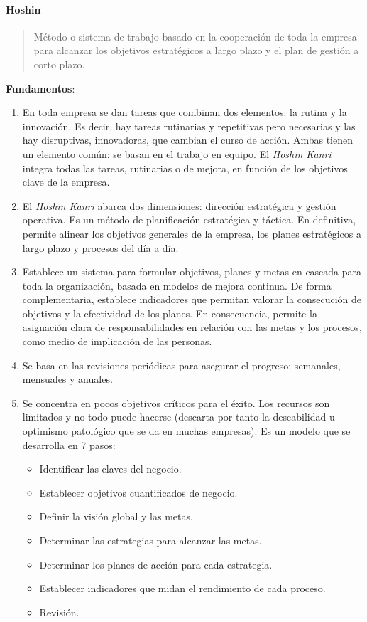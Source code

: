 \documentclass[oneside]{book}
\begin{document}
\paragraph{Hoshin}

\begin{quote}
	Método o sistema de trabajo basado en la cooperación de toda la empresa para alcanzar los objetivos estratégicos a largo plazo y el plan de gestión a corto plazo.
\end{quote}
\textbf{Fundamentos}:
\begin{enumerate}
	\item En toda empresa se dan tareas que combinan dos elementos: la rutina y la innovación. Es decir, hay tareas rutinarias y repetitivas pero necesarias y las hay disruptivas, innovadoras, que cambian el curso de acción. Ambas tienen un elemento común: se basan en el trabajo en equipo. El \textit{Hoshin Kanri} integra todas las tareas, rutinarias o de mejora, en función de los objetivos clave de la empresa.
	
	\item El \textit{Hoshin Kanri} abarca dos dimensiones: dirección estratégica y gestión operativa. Es un método de planificación estratégica y táctica. En definitiva, permite alinear los objetivos generales de la empresa, los planes estratégicos a largo plazo y procesos del día a día.
	
	\item  Establece un sistema para formular objetivos, planes y metas en cascada para toda la organización, basada en modelos de mejora continua. De forma complementaria, establece indicadores que permitan valorar la consecución de objetivos y la efectividad de los planes. En consecuencia, permite la asignación clara de responsabilidades en relación con las metas y los procesos, como medio de implicación de las personas.
	
	\item  Se basa en las revisiones periódicas para asegurar el progreso: semanales, mensuales y anuales.
	
	\item  Se concentra en pocos objetivos críticos para el éxito. Los recursos son limitados y no todo puede hacerse (descarta por tanto la deseabilidad u optimismo patológico que se da en muchas empresas). Es un modelo que se desarrolla en 7 pasos:
	\begin{itemize}
		\item Identificar las claves del negocio.
		\item Establecer objetivos cuantificados de negocio.
		\item Definir la visión global y las metas.
		\item Determinar las estrategias para alcanzar las metas.
		\item Determinar los planes de acción para cada estrategia.
		\item Establecer indicadores que midan el rendimiento de cada proceso.
		\item Revisión.
	\end{itemize}
\end{enumerate}
\end{document}
